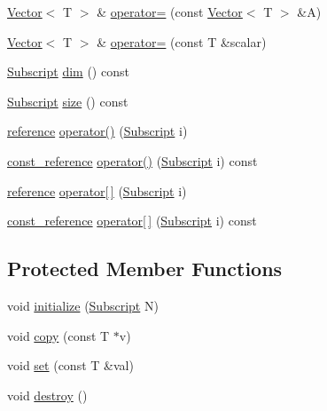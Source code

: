 \begin{DoxyCompactItemize}
\hyperlink{classTNT_1_1Vector}{Vector}$<$ T $>$ \& \hyperlink{classTNT_1_1Vector_ad381a0e422ce8e5a46cc374ee07a8556}{operator=} (const \hyperlink{classTNT_1_1Vector}{Vector}$<$ T $>$ \&A)
\item 
\hyperlink{classTNT_1_1Vector}{Vector}$<$ T $>$ \& \hyperlink{classTNT_1_1Vector_ab4cf6d14d44d75f6b82fcb9178920e11}{operator=} (const T \&scalar)
\item 
\hyperlink{namespaceTNT_af22e3f1460e145c04ce4e7d701e4c1c1}{Subscript} \hyperlink{classTNT_1_1Vector_a5245f2860259591e00fdfcc9ff73cb09}{dim} () const
\item 
\hyperlink{namespaceTNT_af22e3f1460e145c04ce4e7d701e4c1c1}{Subscript} \hyperlink{classTNT_1_1Vector_a4d34328baedd5a4f6e3874811569deb0}{size} () const
\item 
\hyperlink{classTNT_1_1Vector_a9cdf62749080406bdf3fbace264dac85}{reference} \hyperlink{classTNT_1_1Vector_a3c64911f1a80247c6a973f68d7196038}{operator()} (\hyperlink{namespaceTNT_af22e3f1460e145c04ce4e7d701e4c1c1}{Subscript} i)
\item 
\hyperlink{classTNT_1_1Vector_a2957faed9560f1f53bc5943a160d71bf}{const\+\_\+reference} \hyperlink{classTNT_1_1Vector_a5a75964f8c9f814d7a2f011150b2a06b}{operator()} (\hyperlink{namespaceTNT_af22e3f1460e145c04ce4e7d701e4c1c1}{Subscript} i) const
\item 
\hyperlink{classTNT_1_1Vector_a9cdf62749080406bdf3fbace264dac85}{reference} \hyperlink{classTNT_1_1Vector_ac7fc76b0f4937e37d75f9900fec9c6e1}{operator\mbox{[}$\,$\mbox{]}} (\hyperlink{namespaceTNT_af22e3f1460e145c04ce4e7d701e4c1c1}{Subscript} i)
\item 
\hyperlink{classTNT_1_1Vector_a2957faed9560f1f53bc5943a160d71bf}{const\+\_\+reference} \hyperlink{classTNT_1_1Vector_a6aebe1812d10f57221e50850c64f48f1}{operator\mbox{[}$\,$\mbox{]}} (\hyperlink{namespaceTNT_af22e3f1460e145c04ce4e7d701e4c1c1}{Subscript} i) const
\end{DoxyCompactItemize}
\subsection*{Protected Member Functions}
\begin{DoxyCompactItemize}
\item 
void \hyperlink{classTNT_1_1Vector_a4f475be0e3634f05a058e5c10b665c62}{initialize} (\hyperlink{namespaceTNT_af22e3f1460e145c04ce4e7d701e4c1c1}{Subscript} N)
\item 
void \hyperlink{classTNT_1_1Vector_a85902585fa9de818133ead8a89b194ac}{copy} (const T $\ast$v)
\item 
void \hyperlink{classTNT_1_1Vector_a6e6f148d1889821389e560ce4a213ac8}{set} (const T \&val)
\item 
void \hyperlink{classTNT_1_1Vector_afb46bf5892eb43cbd0b8cc8f7a126710}{destroy} ()
\end{DoxyCompactItemize}
